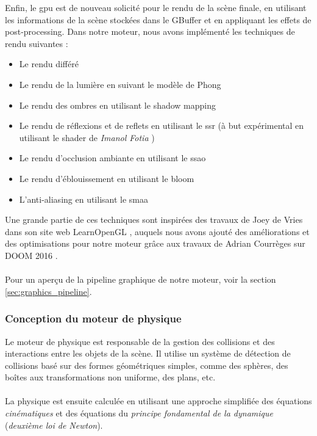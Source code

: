     \newpage
    Enfin, le \gls{gpu} est de nouveau solicité pour le rendu de la scène
    finale, en utilisant les informations de la scène stockées dans le
    \gls{GBuffer} et en appliquant les effets de post-processing.
    Dans notre moteur, nous avons implémenté les techniques de rendu suivantes :
    \begin{itemize}
        \item Le rendu différé
        \item Le rendu de la lumière en suivant le modèle de Phong 
        \item Le rendu des ombres en utilisant le \gls{shadow mapping}
        \item Le rendu de réflexions et de reflets en utilisant le \gls{ssr} (à but expérimental en utilisant le \gls{shader} de \emph{Imanol Fotia} \cite{imanolfotia})
        \item Le rendu d'occlusion ambiante en utilisant le \gls{ssao}
        \item Le rendu d'éblouissement en utilisant le \gls{bloom}
        \item L'anti-aliasing en utilisant le \gls{smaa}
    \end{itemize}

    Une grande partie de ces techniques sont inspirées des travaux de Joey de Vries
    dans son site web LearnOpenGL \cite{learnopengl}, auquels nous avons
    ajouté des améliorations et des optimisations pour notre moteur grâce
    aux travaux de Adrian Courrèges sur DOOM 2016 \cite{courreges_doom2016}.
    \\ \\
    Pour un aperçu de la pipeline graphique de notre moteur, voir la section
    \ref{sec:graphics_pipeline}.

\subsubsection{Conception du moteur de physique}

    Le moteur de physique est responsable de la gestion des collisions et
    des interactions entre les objets de la scène. Il utilise un système de
    détection de collisions basé sur des formes géométriques simples, comme
    des sphères, des boîtes aux transformations non uniforme, des plans, etc.
    \\ \\
    La physique est ensuite calculée en utilisant une approche simplifiée des
    équations \emph{cinématiques} et des équations du \emph{principe fondamental de la dynamique}
    (\emph{deuxième loi de Newton}).


